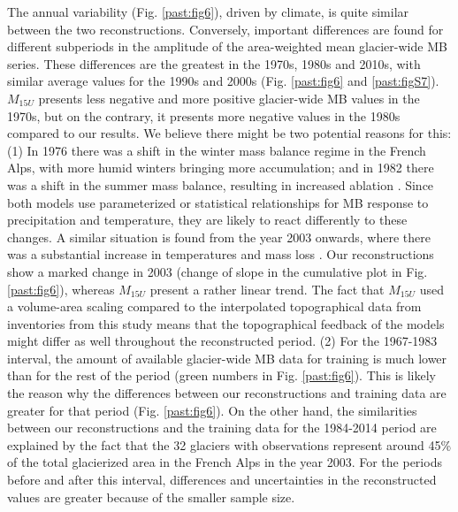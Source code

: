 {The annual variability (Fig. \ref{past:fig6}), driven by climate, is quite similar between the two reconstructions. Conversely, important differences are found for different subperiods in the amplitude of the area-weighted mean glacier-wide MB series. These differences are the greatest in the 1970s, 1980s and 2010s, with similar average values for the 1990s and 2000s (Fig. \ref{past:fig6} and \ref{past:figS7}). $M_{15U}$ presents less negative and more positive glacier-wide MB values in the 1970s, but on the contrary, it presents more negative values in the 1980s compared to our results. We believe there might be two potential reasons for this: (1) In 1976 there was a shift in the winter mass balance regime in the French Alps, with more humid winters bringing more accumulation; and in 1982 there was a shift in the summer mass balance, resulting in increased ablation \citep{thibert_climatic_2013}. Since both models use parameterized or statistical relationships for MB response to precipitation and temperature, they are likely to react differently to these changes. A similar situation is found from the year 2003 onwards, where there was a substantial increase in temperatures and mass loss \citep[e.g.][]{six_sensitivity_2014}. Our reconstructions show a marked change in 2003 (change of slope in the cumulative plot in Fig. \ref{past:fig6}), whereas $M_{15U}$ present a rather linear trend. The fact that $M_{15U}$ used a volume-area scaling compared to the interpolated topographical data from inventories from this study means that the topographical feedback of the models might differ as well throughout the reconstructed period. (2) For the 1967-1983 interval, the amount of available glacier-wide MB data for training is much lower than for the rest of the period (green numbers in Fig. \ref{past:fig6}). This is likely the reason why the differences between our reconstructions and training data are greater for that period (Fig. \ref{past:fig6}). On the other hand, the similarities between our reconstructions and the training data for the 1984-2014 period are explained by the fact that the 32 glaciers with observations represent around 45\% of the total glacierized area in the French Alps in the year 2003. For the periods before and after this interval, differences and uncertainties in the reconstructed values are greater because of the smaller sample size.

}
